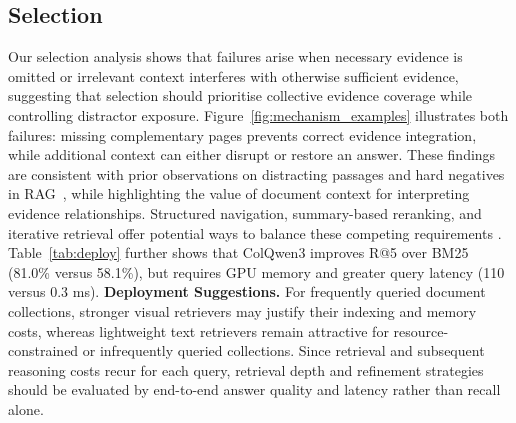 \documentclass[11pt]{article}
\begin{document}
\subsection{Selection}
\label{sec:implications_selection}
Our selection analysis shows that failures arise when necessary evidence is omitted or irrelevant context interferes with otherwise sufficient evidence, suggesting that selection should prioritise collective evidence coverage while controlling distractor exposure. Figure~\ref{fig:mechanism_examples} illustrates both failures: missing complementary pages prevents correct evidence integration, while additional context can either disrupt or restore an answer. These findings are consistent with prior observations on distracting passages and hard negatives in RAG~\citep{cuconasu2024power,jin2025long}, while highlighting the value of document context for interpreting evidence relationships. Structured navigation, summary-based reranking, and iterative retrieval offer potential ways to balance these competing requirements \citep{sun2025docagent,jain2025simpledoc}. Table~\ref{tab:deploy} further shows that ColQwen3 improves R@5 over BM25 (81.0\% versus 58.1\%), but requires GPU memory and greater query latency (110 versus 0.3 ms). \textbf{Deployment Suggestions.} For frequently queried document collections, stronger visual retrievers may justify their indexing and memory costs, whereas lightweight text retrievers remain attractive for resource-constrained or infrequently queried collections. Since retrieval and subsequent reasoning costs recur for each query, retrieval depth and refinement strategies should be evaluated by end-to-end answer quality and latency rather than recall alone.
\end{document}
